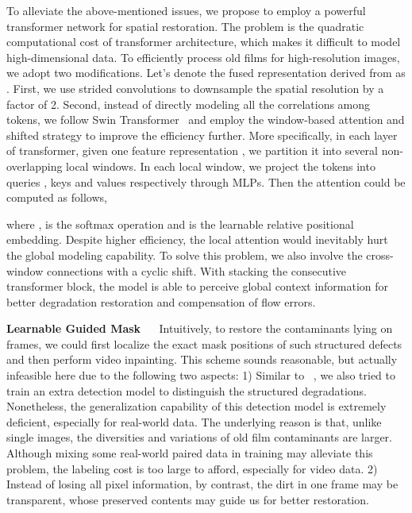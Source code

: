 \documentclass[10pt,twocolumn,letterpaper]{article}
\begin{document}
	To alleviate the above-mentioned issues, we propose to employ a powerful transformer network for spatial restoration. The problem is the quadratic computational cost of transformer architecture, which makes it difficult to model high-dimensional data. To efficiently process old films for high-resolution images, we adopt two modifications. Let's denote the fused representation derived from  as .  First, we use strided convolutions to downsample the spatial resolution by a factor of 2. Second, instead of directly modeling all the correlations among  tokens, we follow Swin Transformer~\cite{Liu_2021_ICCV} and employ the window-based attention and shifted strategy to improve the efficiency further. More specifically, in each layer of transformer, given one feature representation , we partition it into several non-overlapping  local windows. In each local window, we project the tokens into queries , keys  and values  respectively through MLPs. Then the attention could be computed as follows,
	
	
	where ,  is the softmax operation and  is the learnable relative positional embedding. Despite higher efficiency, the local attention would inevitably hurt the global modeling capability. To solve this problem, we also involve the cross-window connections with a cyclic shift. With stacking the consecutive transformer block, the model is able to perceive global context information for better degradation restoration and compensation of flow errors.
	
	
	
	\noindent\textbf{Learnable Guided Mask} ~~ Intuitively, to restore the contaminants lying on frames, we could first localize the exact mask positions of such structured defects and then perform video inpainting. This scheme sounds reasonable, but actually infeasible here due to the following two aspects: 1) Similar to ~\cite{wan2020bringing}, we also tried to train an extra detection model to distinguish the structured degradations. Nonetheless, the generalization capability of this detection model is extremely deficient, especially for real-world data. The underlying reason is that, unlike single images, the diversities and variations of old film contaminants are larger. Although mixing some real-world paired data in training may alleviate this problem, the labeling cost is too large to afford, especially for video data. 2) Instead of losing all pixel information, by contrast, the dirt in one frame may be transparent, whose preserved contents may guide us for better restoration.
	
\end{document}
